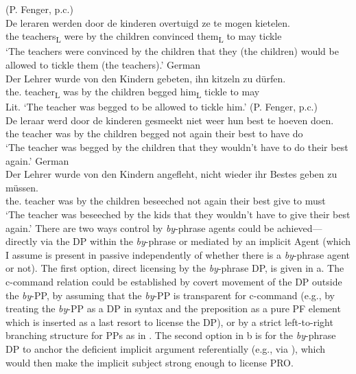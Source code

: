 \documentclass[output=paper]{langsci/langscibook}
\begin{document}
\ea\label{ex:23.7}
	\ea\label{ex:23.7a}  (P. Fenger, p.c.)\\
		\gll De leraren  werden  door de kinderen  overtuigd  ze  te mogen  kietelen.\\
			the teachers\textsubscript{L}  were  by the children  convinced  them\textsubscript{L}  to may  tickle\\
		\glt ‘The teachers were convinced by the children that they (the
        children) would be allowed to tickle them (the teachers).’
	\ex\label{ex:23.7b} German\\
		\gll Der Lehrer  wurde  von den Kindern  gebeten,  ihn  kitzeln  zu dürfen.\\
			the.\Nom{} teacher\textsubscript{L}  was  by the children  begged  him\textsubscript{L}  tickle  to may\\
		\glt Lit. ‘The teacher was begged to be allowed to tickle him.’
	\z
\ex\label{ex:23.8}
	\ea\label{ex:23.8a}  (P. Fenger, p.c.)\\
		\gll De leraar  werd  door de kinderen  gesmeekt niet  weer  hun best  te hoeven  doen.\\
			the teacher  was  by the children  begged not  again  their best  to have  do\\
		\glt ‘The teacher was begged by the children that they wouldn’t have to do their best again.’
	\ex\label{ex:23.8b} German\\
		\gll Der Lehrer  wurde  von den Kindern  angefleht, nicht  wieder  ihr Bestes  geben  zu müssen.\\
			the.\Nom{} teacher  was  by the children  beseeched not  again  their best  give  to must\\
		\glt ‘The teacher was beseeched by the kids that they wouldn’t have to give their best again.’
	\z
\z
%
There are two ways control by \emph{by}-phrase agents could be
achieved—directly via the DP within the \emph{by}-phrase or mediated by an
implicit Agent (which I assume is present in passive independently of whether
there is a \emph{by}-phrase agent or not). The first option, direct licensing
by the \emph{by}-phrase DP, is given in a. The c-command relation could be
established by covert movement of the DP outside the \emph{by}-PP, by
assuming that the \emph{by}-PP is transparent for c-command (e.g., by
treating the \emph{by}-PP as a DP in syntax and the preposition as a pure PF
element which is inserted as a last resort to license the DP), or by a strict
left-to-right branching structure for PPs as in \citet{Pesetsky1995}. The
second option in b is for the \emph{by}-phrase DP to anchor the deficient
implicit argument referentially (e.g., via ), which would then make the
implicit subject strong enough to license PRO.\largerpage
\end{document}
